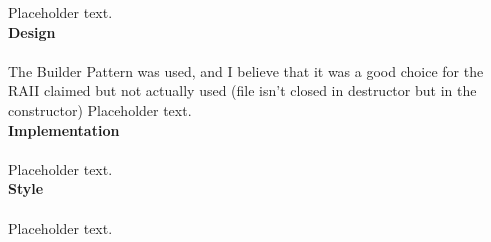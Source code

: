 \documentclass[12pt]{article}
\begin{document}
Placeholder text.\\

\textbf{Design}\\\\
The Builder Pattern was used, and I believe that it was a good choice for the
RAII claimed but not actually used (file isn't closed in destructor but in the constructor)
Placeholder text.\\

\textbf{Implementation}\\\\
Placeholder text.\\

\textbf{Style}\\\\
Placeholder text.\\
\end{document}
